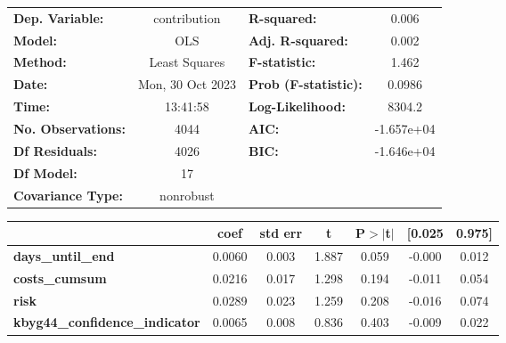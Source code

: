 \begin{center}
\begin{tabular}{lclc}
\toprule
\textbf{Dep. Variable:}                     &   contribution   & \textbf{  R-squared:         } &     0.006   \\
\textbf{Model:}                             &       OLS        & \textbf{  Adj. R-squared:    } &     0.002   \\
\textbf{Method:}                            &  Least Squares   & \textbf{  F-statistic:       } &     1.462   \\
\textbf{Date:}                              & Mon, 30 Oct 2023 & \textbf{  Prob (F-statistic):} &   0.0986    \\
\textbf{Time:}                              &     13:41:58     & \textbf{  Log-Likelihood:    } &    8304.2   \\
\textbf{No. Observations:}                  &        4044      & \textbf{  AIC:               } & -1.657e+04  \\
\textbf{Df Residuals:}                      &        4026      & \textbf{  BIC:               } & -1.646e+04  \\
\textbf{Df Model:}                          &          17      & \textbf{                     } &             \\
\textbf{Covariance Type:}                   &    nonrobust     & \textbf{                     } &             \\
\bottomrule
\end{tabular}
\begin{tabular}{lcccccc}
                                            & \textbf{coef} & \textbf{std err} & \textbf{t} & \textbf{P$> |$t$|$} & \textbf{[0.025} & \textbf{0.975]}  \\
\midrule
\textbf{days\_until\_end}                   &       0.0060  &        0.003     &     1.887  &         0.059        &       -0.000    &        0.012     \\
\textbf{costs\_cumsum}                      &       0.0216  &        0.017     &     1.298  &         0.194        &       -0.011    &        0.054     \\
\textbf{risk}                               &       0.0289  &        0.023     &     1.259  &         0.208        &       -0.016    &        0.074     \\
\textbf{kbyg44\_confidence\_indicator}      &       0.0065  &        0.008     &     0.836  &         0.403        &       -0.009    &        0.022     \\

\end{tabular}
\end{center}
